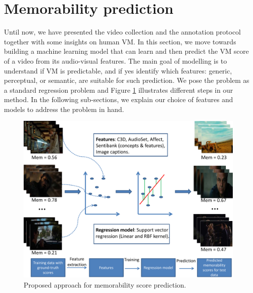 \documentclass[sigconf]{acmart}
\begin{document}
\section{Memorability prediction} %
\label{mem-pred}
Until now, we have presented the video collection and the annotation protocol together with some insights on human VM. 
In this section, we move towards building a machine learning model that can learn and then predict the VM score of a video from its audio-visual features.
The main goal of modelling is to understand if VM is predictable, and if yes identify which features: generic, perceptual, or semantic, are suitable for such prediction.
We pose the problem as a standard regression problem and Figure \ref{prop-apprch} illustrates different steps in our method.
In the following sub-sections, we explain our choice of features and models to address the problem in hand.

\begin{figure}[h]	  
	\centering
	\includegraphics[width=0.9\columnwidth]{figures/approach.pdf}
	\caption{Proposed approach for memorability score prediction.}
	\label{prop-apprch}
\end{figure}
\end{document}
